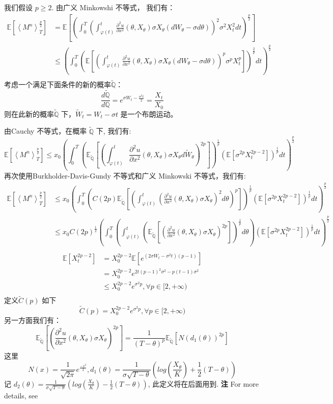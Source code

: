 我们假设 $p\geq 2$. 由广义 Minkowshi 不等式， 我们有：
\[
\begin{split} 
\mathbb{E}[\left \langle M^n \right \rangle_T^{\frac{p}{2}}]
&=\mathbb{E}[(\int_0^T(\int_{\varphi(t)}^t \frac{\partial^2 u}{\partial x^2}(\theta, X_\theta)\sigma X_\theta (dW_\theta-\sigma d\theta))^2\sigma^2 X_t^2 dt)^{\frac{p}{2}}]\\
&\leq (\int_0^T(\mathbb{E}[(\int_{\varphi(t)}^t \frac{\partial^2 u}{\partial x^2}(\theta, X_\theta)\sigma X_\theta (dW_\theta-\sigma d\theta))^p\sigma^p X_t^p] )^{\frac{2}{p}}dt)^{\frac{p}{2}}\\
\end{split}
\]
考虑一个满足下面条件的新的概率$\widetilde{\mathbb{Q}}$： 
$$\frac{d\widetilde{\mathbb{Q}}}{d\mathbb{Q}}=e^{\sigma W_t-\frac{\sigma^2t}{2}}=\frac{X_t}{X_0}$$ 
则在此新的概率$\widetilde{\mathbb{Q}}$ 下，$\widetilde{W}_t=W_t-\sigma t$ 是一个布朗运动。

由Cauchy 不等式，在概率 $\widetilde{\mathbb{Q}}$ 下, 我们有:
\[
\mathbb{E}[\left \langle M^n \right \rangle_T^{\frac{p}{2}}]\leq x_0
(\int_0^T(\mathbb{E}_{\widetilde{\mathbb{Q}}}[(\int_{\varphi(t)}^t \frac{\partial^2 u}{\partial x^2}(\theta, X_\theta)\sigma X_\theta d\widetilde{W}_\theta)^{2p}])^{\frac{1}{p}}(\mathbb{E}[\sigma^{2p} X_t^{2p-2}] )^{\frac{1}{p}}dt)^{\frac{p}{2}}
\]
再次使用Burkholder-Davis-Gundy 不等式和广义 Minkowski 不等式，我们有:
\[
\begin{split}
\mathbb{E}[\left \langle M^n \right \rangle_T^{\frac{p}{2}}]&\leq x_0
(\int_0^T(C(2p)\mathbb{E}_{\widetilde{\mathbb{Q}}}[(\int_{\varphi(t)}^t (\frac{\partial^2 u}{\partial x^2}(\theta, X_\theta)\sigma X_\theta)^2 d\theta)^{p}])^{\frac{1}{p}}(\mathbb{E}[\sigma^{2p} X_t^{2p-2}] )^{\frac{1}{p}}dt)^{\frac{p}{2}}\\
&\leq x_0C(2p)^{\frac{1}{2}}(\int_0^T(\int_{\varphi(t)}^t(\mathbb{E}_{\widetilde{\mathbb{Q}}}[ (\frac{\partial^2 u}{\partial x^2}(\theta, X_\theta)\sigma X_\theta)^{2p}])^{\frac{1}{p}} d\theta)(\mathbb{E}[\sigma^{2p} X_t^{2p-2}] )^{\frac{1}{p}}dt)^{\frac{p}{2}}\\
\end{split}
\]
\[
\begin{split}
\mathbb{E}[X_t^{2p-2}]&=X_0^{2p-2}\mathbb{E}[e^{(2\sigma W_t-\sigma^2t)(p-1)}]\\
&=X_0^{2p-2}e^{2t(p-1)^2\sigma^2-p(t-1)\sigma^2}\\
&\leq
X_0^{2p-2}e^{\sigma^2p}, \forall p\in [2, +\infty)\\
\end{split}
\]
定义$\widetilde{C}(p)$ 如下 
\[
\widetilde{C}(p)=
X_0^{2p-2}e^{\sigma^2p}, \forall p\in  [2, +\infty)
\]
另一方面我们有：
\[
\mathbb{E}_{\widetilde{\mathbb{Q}}}[ (\frac{\partial^2 u}{\partial x^2}(\theta, X_\theta)\sigma X_\theta)^{2p}]=\frac{1}{(T-\theta)^p}\mathbb{E}_{\widetilde{\mathbb{Q}}}[N(d_1(\theta))^{2p}]
\]
这里
\[
N(x)=\frac{1}{\sqrt{2\pi}}e^{\frac{-x^2}{2}}, d_1(\theta)=\frac{1}{\sigma\sqrt{T-\theta}}(log(\frac{X_\theta}{K})+\frac{1}{2}(T-\theta))
\]
记 $d_2(\theta)=\frac{1}{\sigma\sqrt{T-\theta}}(log(\frac{X_\theta}{K})-\frac{1}{2}(T-\theta))$, 此定义将在后面用到.
\textbf{注} 
For more details, see \cite{mathematique}

